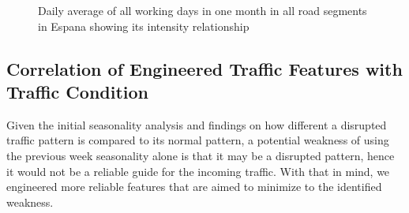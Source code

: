 \begin{figure}
    \centering
      \captionsetup{justification=centering}
    \hfill
    \caption{Daily average of all working days in one month in all road segments in Espana showing its intensity relationship}

    \label{figure_traffic_espana}
\end{figure}






















\subsection{Correlation of Engineered Traffic Features with Traffic Condition}
Given the initial seasonality analysis and findings on how different a disrupted traffic pattern is compared to its normal pattern, a potential weakness of using the previous week seasonality alone is that it may be a disrupted pattern, hence it would not be a reliable guide for the incoming traffic. With that in mind, we engineered more reliable features that are aimed to minimize to the identified weakness.

